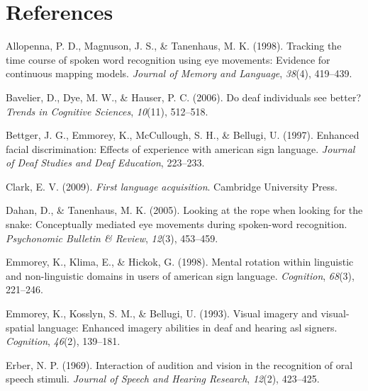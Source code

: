 \documentclass[,man,floatsintext]{apa6}
\begin{document}
\newpage

\hypertarget{references}{%
\section{References}\label{references}}

\setlength{\parindent}{-0.5in}
\setlength{\leftskip}{0.5in}

\hypertarget{refs}{}
\leavevmode\hypertarget{ref-allopenna1998tracking}{}%
Allopenna, P. D., Magnuson, J. S., \& Tanenhaus, M. K. (1998). Tracking the time course of spoken word recognition using eye movements: Evidence for continuous mapping models. \emph{Journal of Memory and Language}, \emph{38}(4), 419--439.

\leavevmode\hypertarget{ref-bavelier2006deaf}{}%
Bavelier, D., Dye, M. W., \& Hauser, P. C. (2006). Do deaf individuals see better? \emph{Trends in Cognitive Sciences}, \emph{10}(11), 512--518.

\leavevmode\hypertarget{ref-bettger1997enhanced}{}%
Bettger, J. G., Emmorey, K., McCullough, S. H., \& Bellugi, U. (1997). Enhanced facial discrimination: Effects of experience with american sign language. \emph{Journal of Deaf Studies and Deaf Education}, 223--233.

\leavevmode\hypertarget{ref-clark2009first}{}%
Clark, E. V. (2009). \emph{First language acquisition}. Cambridge University Press.

\leavevmode\hypertarget{ref-dahan2005looking}{}%
Dahan, D., \& Tanenhaus, M. K. (2005). Looking at the rope when looking for the snake: Conceptually mediated eye movements during spoken-word recognition. \emph{Psychonomic Bulletin \& Review}, \emph{12}(3), 453--459.

\leavevmode\hypertarget{ref-emmorey1998mental}{}%
Emmorey, K., Klima, E., \& Hickok, G. (1998). Mental rotation within linguistic and non-linguistic domains in users of american sign language. \emph{Cognition}, \emph{68}(3), 221--246.

\leavevmode\hypertarget{ref-emmorey1993visual}{}%
Emmorey, K., Kosslyn, S. M., \& Bellugi, U. (1993). Visual imagery and visual-spatial language: Enhanced imagery abilities in deaf and hearing asl signers. \emph{Cognition}, \emph{46}(2), 139--181.

\leavevmode\hypertarget{ref-erber1969interaction}{}%
Erber, N. P. (1969). Interaction of audition and vision in the recognition of oral speech stimuli. \emph{Journal of Speech and Hearing Research}, \emph{12}(2), 423--425.
\end{document}
